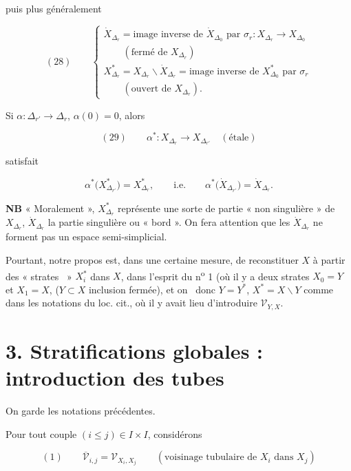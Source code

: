 \documentclass[11pt,a4paper]{article}
\begin{document}
puis  plus généralement

\[
  (28) \qquad
  \begin{cases}
    \dot{X}_{\Delta_r} = \text{image inverse de } \dot{X}_{\Delta_0}
      \text{ par } \sigma_r : X_{\Delta_r} \to X_{\Delta_0} \\
    \qquad (\text{fermé de } X_{\Delta_r}) \\[2pt]
    X^{*}_{\Delta_r} = X_{\Delta_r} \smallsetminus \dot{X}_{\Delta_r}
      = \text{image inverse de } X^{*}_{\Delta_0} \text{ par } \sigma_r \\
    \qquad (\text{ouvert de } X_{\Delta_r}) .
  \end{cases}
\]

Si $\alpha : \Delta_{r'} \to \Delta_r$, $\alpha(0) = 0$, alors

\[
  (29) \qquad
  \alpha^{*} : X_{\Delta_r} \longrightarrow X_{\Delta_{r'}} \quad (\text{étale})
\]

satisfait

\[
  \alpha^{*}\bigl( X^{*}_{\Delta_{r'}} \bigr) = X^{*}_{\Delta_r},
  \qquad \text{i.e.} \qquad
  \alpha^{*}\bigl( \dot{X}_{\Delta_{r'}} \bigr) = \dot{X}_{\Delta_r} .
\]

 \textbf{NB} « Moralement », $X^{*}_{\Delta_r}$ représente
une sorte de partie « non singulière » de $X_{\Delta_r}$,
$\dot{X}_{\Delta_r}$ la partie singulière ou « bord ». On fera attention que
les $\dot{X}_{\Delta_r}$ ne forment pas un espace semi-simplicial.

Pourtant, notre propos est, dans une certaine mesure, de reconstituer $X$ à
partir des « strates \ill\ » $X_i^{*}$ dans $X$, dans l'esprit du n\textsuperscript{o} 1
(où il y a deux strates $X_0 = Y$ et $X_1 = X$, \struck{\ill}
($Y \subset X$ inclusion fermée), et on \ill\ donc $Y = Y^{*}$,
$X^{*} = X \smallsetminus Y$ comme dans les notations du loc. cit., où il y
avait lieu d'introduire $\mathcal{V}_{Y,X}$.

\section*{3. Stratifications globales : introduction des tubes}

On garde les notations précédentes.

Pour tout couple $(i \leq j) \in I \times I$, considérons

\[
  (1) \qquad
  \overline{\mathcal{V}}_{i,j} = \mathcal{V}_{X_i, X_j}
  \qquad (\text{voisinage tubulaire de } X_i \text{ dans } X_j)
\]
\end{document}
